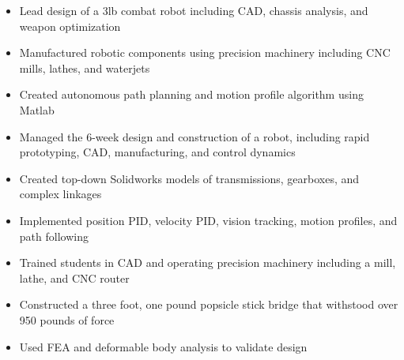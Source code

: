 \documentclass{resume}
\begin{document}
\begin{itemize}
  \item Lead design of a 3lb combat robot including CAD, chassis analysis, and weapon optimization
  \item Manufactured robotic components using precision machinery including CNC mills, lathes, and waterjets
  \item Created autonomous path planning and motion profile algorithm using Matlab
\end{itemize}

\begin{itemize}
  \item Managed the 6-week design and construction of a robot, including rapid prototyping, CAD, manufacturing, and control dynamics
  \item Created top-down Solidworks models of transmissions, gearboxes, and complex linkages
  \item Implemented position PID, velocity PID, vision tracking, motion profiles, and path following
  \item Trained students in CAD and operating precision machinery including a mill, lathe, and CNC router
\end{itemize}

\begin{itemize}
  \item Constructed a three foot, one pound popsicle stick bridge that withstood over 950 pounds of force
  \item Used FEA and deformable body analysis to validate design
\end{itemize}


\end{document}

